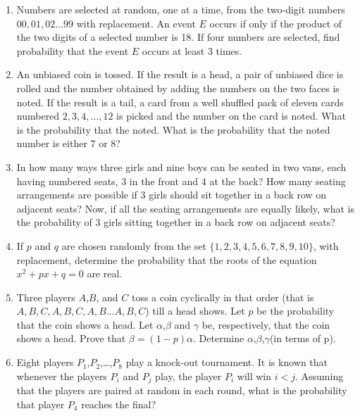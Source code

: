 \documentclass[journal,12pt,onecolumn]{IEEEtran}
\theoremstyle{remark}
\begin{document}
\begin{enumerate}
\hfill{}

\item Numbers are selected at random, one at a time, from the two-digit numbers $00, 01, 02 \dots 99 $ with replacement. An event $E$ occurs if only if the product of the two digits of a selected number is 18. If four numbers are selected, find probability that the event $E$ occurs at least 3 times.

\hfill{}

\item An unbiased coin is tossed. If the result is a head, a pair of unbiased dice is rolled and the number obtained by adding the numbers on the two faces is noted. If the result is a tail, a card from a well shuffled pack of eleven cards numbered $ 2, 3, 4, \dots , 12 $ is picked and the number on the card is noted. What is the probability that the noted. What is the probability that the noted number is either 7 or 8?

\hfill{}

\item In how many ways three girls and nine boys can be seated in two vans, each having numbered seats, $3$ in the front and $4$ at the back? How many seating arrangements are possible if 3 girls should sit together in a back row on adjacent seats? Now, if all the seating arrangements are equally likely, what is the probability of 3 girls sitting together in a back row on adjacent seats?

\hfill{}

\item If $p$ and $q$ are chosen randomly from the set $\{1,2,3,4,5,6,7,8,9,10\}$, with replacement, determine the probability that the roots of the equation $x^2+px+q=0$ are real.
                                                      
\hfill{}

\item Three players $A$,$B$, and $C$ toss a coin cyclically in that order (that is$ A,B,C,A,B,C,A,B \dots A,B,C $) till a head shows. Let $p$ be the probability that the coin shows a head. Let $\alpha$,$\beta$ and $\gamma$ be, respectively, that the coin shows a head. Prove that $\beta=(1-p)\alpha$. Determine $\alpha$,$\beta$,$\gamma$(in terms of p).

\hfill{}

\item Eight players $P_{1}$,$P_{2}$,\dots ,$P_{8}$ play a knock-out tournament. It is known that whenever the players $P_{i}$ and $P_{j}$ play, the player $P_{i}$ will win $i<j$. Assuming that the players are paired at random in each round, what is the probability that player $P_{4}$ reaches the final?


\end{enumerate}
\end{document}
